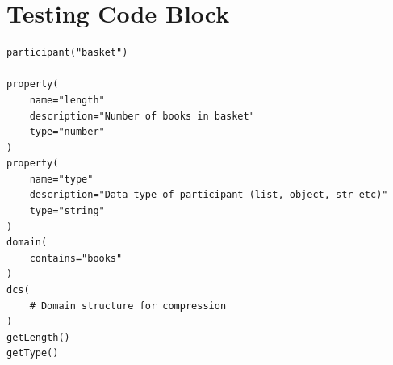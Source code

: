 \documentclass{article}
\begin{document}
\section{Testing Code Block}

\begin{tcolorbox}
\begin{verbatim}
participant("basket")

property(
    name="length"
    description="Number of books in basket"
    type="number"
)
property(
    name="type"
    description="Data type of participant (list, object, str etc)"
    type="string"
)
domain(
    contains="books"
)
dcs(
    # Domain structure for compression
)
getLength()
getType()
\end{verbatim}
\end{tcolorbox}
\end{document}
